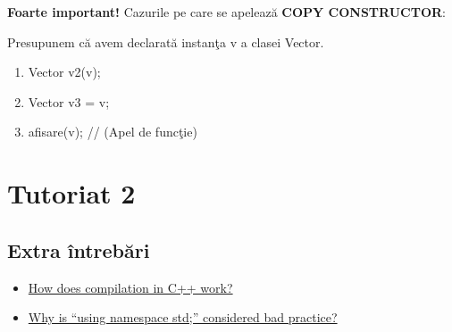 \documentclass{article}
\begin{document}
\textbf{Foarte important!} Cazurile pe care se apelează \textbf{COPY CONSTRUCTOR}:

Presupunem că avem declarată instanţa v a clasei Vector.
\begin{enumerate}
    \item Vector v2(v);
    \item Vector v3 = v;
    \item afisare(v); // (Apel de funcţie)
\end{enumerate}

\section*{Tutoriat 2}



\subsection*{Extra întrebări}
\begin{itemize}
    \item \href{https://www.freelancer.com/community/articles/how-c-works-understanding-compilation}{How does compilation in C++ work?}
    \item \href{https://stackoverflow.com/questions/1452721/why-is-using-namespace-std-considered-bad-practice}{Why is “using namespace std;” considered bad practice?}
\end{itemize}
\end{document}
